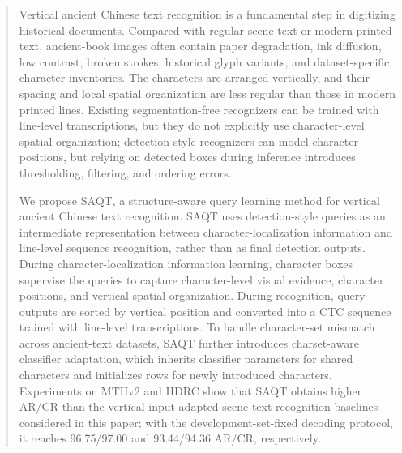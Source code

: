 \begin{abstract}
Vertical ancient Chinese text recognition is a fundamental step in digitizing historical documents. Compared with regular scene text or modern printed text, ancient-book images often contain paper degradation, ink diffusion, low contrast, broken strokes, historical glyph variants, and dataset-specific character inventories. The characters are arranged vertically, and their spacing and local spatial organization are less regular than those in modern printed lines. Existing segmentation-free recognizers can be trained with line-level transcriptions, but they do not explicitly use character-level spatial organization; detection-style recognizers can model character positions, but relying on detected boxes during inference introduces thresholding, filtering, and ordering errors.

We propose SAQT, a structure-aware query learning method for vertical ancient Chinese text recognition. SAQT uses detection-style queries as an intermediate representation between character-localization information and line-level sequence recognition, rather than as final detection outputs. During character-localization information learning, character boxes supervise the queries to capture character-level visual evidence, character positions, and vertical spatial organization. During recognition, query outputs are sorted by vertical position and converted into a CTC sequence trained with line-level transcriptions. To handle character-set mismatch across ancient-text datasets, SAQT further introduces charset-aware classifier adaptation, which inherits classifier parameters for shared characters and initializes rows for newly introduced characters. Experiments on MTHv2 and HDRC show that SAQT obtains higher AR/CR than the vertical-input-adapted scene text recognition baselines considered in this paper; with the development-set-fixed decoding protocol, it reaches 96.75/97.00 and 93.44/94.36 AR/CR, respectively.
\end{abstract}
